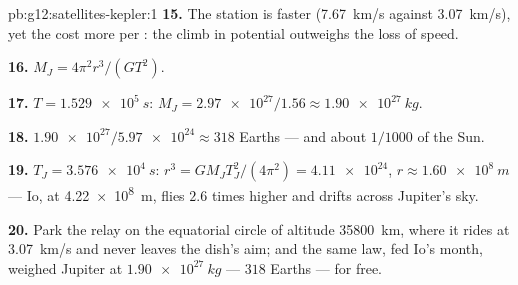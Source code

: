 \begin{solution}{pb:g12:satellites-kepler:1}
\textbf{15.} The station is faster (\qty{7.67}{km/s} against
\qty{3.07}{km/s}), yet the  cost more  per
: the climb in potential  outweighs the loss of speed.

\textbf{16.} $M_J = 4\pi^2 r^3/(G T^2)$.

\textbf{17.} $T = \qty{1.529e5}{s}$: $M_J =
\num{2.97e27}/1.56 \approx \qty{1.90e27}{kg}$.

\textbf{18.} $\num{1.90e27}/\num{5.97e24} \approx 318$ Earths ---
and about $1/1000$ of the Sun.

\textbf{19.} $T_J = \qty{3.576e4}{s}$: $r^3 = GM_J T_J^2/(4\pi^2) =
\num{4.11e24}$, $r \approx \qty{1.60e8}{m}$ --- Io, at
\qty{4.22e8}{m}, flies $2.6$ times higher and drifts across Jupiter's
sky.

\textbf{20.} Park the relay on the equatorial circle of altitude
\qty{35800}{km}, where it rides at \qty{3.07}{km/s} and never leaves
the dish's aim; and the same law, fed Io's month, weighed Jupiter at
$\qty{1.90e27}{kg}$ --- $318$ Earths --- for free.
\end{solution}
